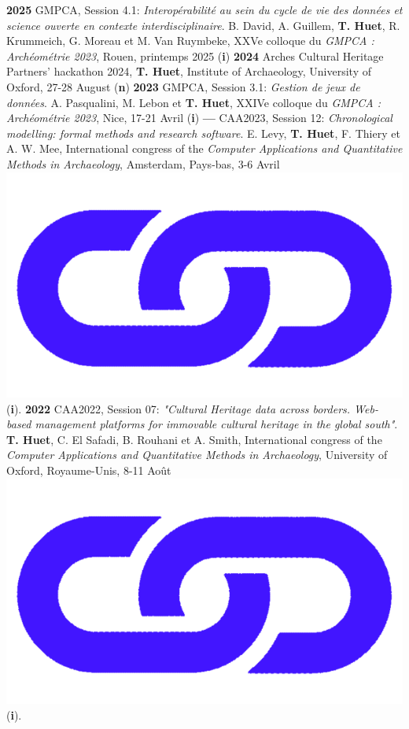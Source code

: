 \documentclass{article}
\begin{document}
\textbf{2025 }GMPCA, Session 4.1: \textit{Interopérabilité au sein du cycle de vie des données et science ouverte en contexte interdisciplinaire}. B. David, A. Guillem, \textbf{T. Huet}, R. Krummeich, G. Moreau et M. Van Ruymbeke, XXVe colloque du \textit{GMPCA : Archéométrie 2023}, Rouen, printemps 2025 (\textbf{i})
\smallbreak
\textbf{2024 }Arches Cultural Heritage Partners' hackathon 2024, \textbf{T. Huet}, Institute of Archaeology, University of Oxford, 27-28 August (\textbf{n})
\smallbreak
\textbf{2023 }GMPCA, Session 3.1: \textit{Gestion de jeux de données}. A. Pasqualini, M. Lebon et \textbf{T. Huet}, XXIVe colloque du \textit{GMPCA : Archéométrie 2023}, Nice, 17-21 Avril (\textbf{i})
\smallbreak
\textbf{--- }CAA2023, Session 12: \textit{Chronological modelling: formal methods and research software}. E. Levy, \textbf{T. Huet}, F. Thiery et A. W. Mee, International congress of the \textit{Computer Applications and Quantitative Methods in Archaeology}, Amsterdam, Pays-bas, 3-6 Avril \href{https://historical-time.github.io/caa23/s12/pres/#/title-slide}{\includegraphics[scale=0.02]{link_darkblue.png}} (\textbf{i}).
\smallbreak
\textbf{2022 }CAA2022, Session 07: \textit{"Cultural Heritage data across borders. Web-based management platforms for immovable cultural heritage in the global south"}. \textbf{T. Huet}, C. El Safadi, B. Rouhani et A. Smith, International congress of the \textit{Computer Applications and Quantitative Methods in Archaeology}, University of Oxford, Royaume-Unis, 8-11 Août \href{https://eamena-project.github.io/reveal.js/projects/caa22s07.html}{\includegraphics[scale=0.02]{link_darkblue.png}} (\textbf{i}). 
\end{document}
